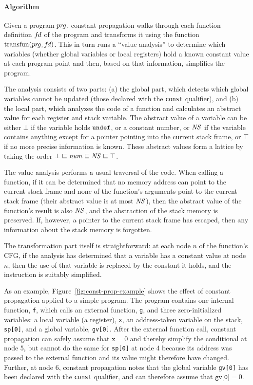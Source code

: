 \paragraph{Algorithm}

Given a program ${pr\hspace*{-1pt}g}$, constant propagation walks through each function definition ${f\hspace*{-1pt}d}$ of the program 
and transforms it using the function $\mathrm{transfun}({pr\hspace*{-1pt}g}, {f\hspace*{-1pt}d})$.
This in turn runs a ``value analysis'' to determine which variables (whether global variables or local registers) hold a known constant value at each program point
and then, based on that information, simplifies the program.

The analysis consists of two parts: 
(a) the global part, which detects which global variables cannot be updated (\ie those declared with the \texttt{const} qualifier), and
(b) the local part, which analyzes the code of a function and calculates an abstract value for each register and stack variable.
The abstract value of a variable can be either $\bot$ if the variable holds $\tt undef$, 
or a constant number, 
or $\mathit{NS}$ if the variable contains anything except for a pointer pointing into the current stack frame, 
or $\top$ if no more precise information is known.
These abstract values form a lattice by taking the order $\bot \sqsubseteq \mathit{num} \sqsubseteq \mathit{NS} \sqsubseteq \top$.


The value analysis performs a usual traversal of the code. 
When calling a function, 
if it can be determined that no memory address can point to the current stack frame 
and none of the function's arguments point to the current stack frame (\ie their abstract value is at most $\mathit{NS}$), 
then the abstract value of the function's result is also $\mathit{NS}$, and the abstraction of the stack memory is preserved.
If, however, a pointer to the current stack frame has escaped, then any information about the stack memory is forgotten.

The transformation part itself is straightforward: 
at each node $n$ of the function's CFG, if the analysis has determined that a variable has a constant value at node $n$,
then the use of that variable is replaced by the constant it holds, and the instruction is suitably simplified.

As an example, 
Figure~\ref{fig:const-prop-example} shows the effect of constant propagation applied to a simple program.
The program contains one internal function, \texttt{f}, which calls an external function, \texttt{g},
and three zero-initialized variables: 
a local variable (a register), \texttt{x}, 
an address-taken variable on the stack, \texttt{sp[0]},
and a global variable, \texttt{gv[0]}.
After the external function call, 
constant propagation can safely assume that $\texttt{x}=0$ and thereby simplify the conditional at node 5,
but cannot do the same for \texttt{sp[0]} at node 4
because its address was passed to the external function and its value might therefore have changed.
Further, at node 6, 
constant propagation notes that the global variable \texttt{gv[0]} has been declared with the \texttt{const} qualifier,
and can therefore assume that $\texttt{gv[0]}=0$.



